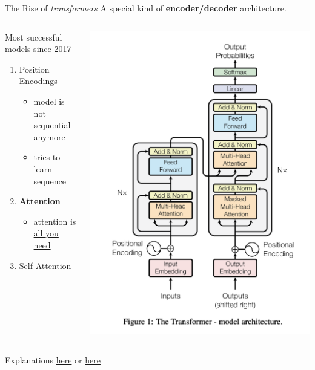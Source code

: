 \documentclass[
  ignorenonframetext,
]{beamer}
\providecommand{\tightlist}{%
  \setlength{\itemsep}{0pt}\setlength{\parskip}{0pt}}\usepackage{longtable,booktabs,array}
\begin{document}
\begin{frame}{The Rise of \emph{transformers}}
\label{the-rise-of-transformers}
A special kind of \textbf{encoder/decoder} architecture.

\begin{columns}[T]
\begin{column}{0.48\linewidth}
Most successful models since 2017

\begin{enumerate}
\tightlist
\item
  Position Encodings

  \begin{itemize}
  \tightlist
  \item
    model is not sequential anymore
  \item
    tries to learn sequence
  \end{itemize}
\item
  \textbf{Attention}

  \begin{itemize}
  \tightlist
  \item
    \href{https://arxiv.org/abs/1706.03762}{attention is all you need}
  \end{itemize}
\item
  Self-Attention
\end{enumerate}
\end{column}

\begin{column}{0.48\linewidth}
\includegraphics[width=0.6\linewidth,height=\textheight,keepaspectratio]{assets/transformers.png}
\end{column}
\end{columns}

Explanations
\href{https://towardsdatascience.com/transformers-141e32e69591}{here} or
\href{https://blogs.nvidia.com/blog/2022/03/25/what-is-a-transformer-model/}{here}
\end{frame}
\end{document}

